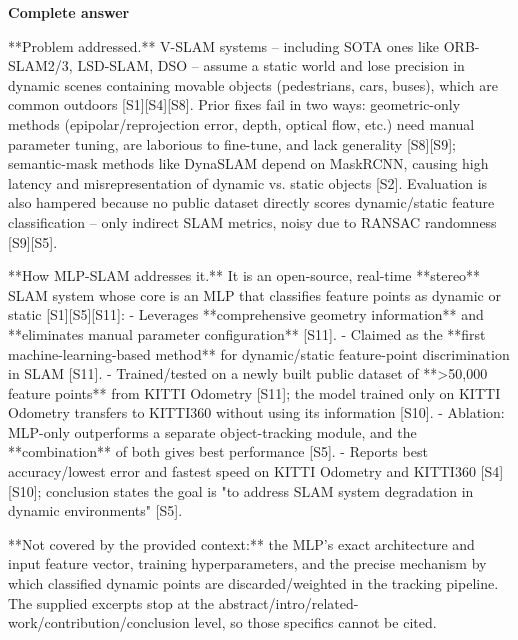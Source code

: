 \documentclass[10pt]{article}
\begin{document}
\textbf{Complete answer}
\begin{AnswerText}
**Problem addressed.** V-SLAM systems -- including SOTA ones like ORB-SLAM2/3, LSD-SLAM, DSO -- assume a static world and lose precision in dynamic scenes containing movable objects (pedestrians, cars, buses), which are common outdoors [S1][S4][S8]. Prior fixes fail in two ways: geometric-only methods (epipolar/reprojection error, depth, optical flow, etc.) need manual parameter tuning, are laborious to fine-tune, and lack generality [S8][S9]; semantic-mask methods like DynaSLAM depend on MaskRCNN, causing high latency and misrepresentation of dynamic vs. static objects [S2]. Evaluation is also hampered because no public dataset directly scores dynamic/static feature classification -- only indirect SLAM metrics, noisy due to RANSAC randomness [S9][S5].

**How MLP-SLAM addresses it.** It is an open-source, real-time **stereo** SLAM system whose core is an MLP that classifies feature points as dynamic or static [S1][S5][S11]:
- Leverages **comprehensive geometry information** and **eliminates manual parameter configuration** [S11].
- Claimed as the **first machine-learning-based method** for dynamic/static feature-point discrimination in SLAM [S11].
- Trained/tested on a newly built public dataset of **>50,000 feature points** from KITTI Odometry [S11]; the model trained only on KITTI Odometry transfers to KITTI360 without using its information [S10].
- Ablation: MLP-only outperforms a separate object-tracking module, and the **combination** of both gives best performance [S5].
- Reports best accuracy/lowest error and fastest speed on KITTI Odometry and KITTI360 [S4][S10]; conclusion states the goal is "to address SLAM system degradation in dynamic environments" [S5].

**Not covered by the provided context:** the MLP's exact architecture and input feature vector, training hyperparameters, and the precise mechanism by which classified dynamic points are discarded/weighted in the tracking pipeline. The supplied excerpts stop at the abstract/intro/related-work/contribution/conclusion level, so those specifics cannot be cited.
\end{AnswerText}
\end{document}

